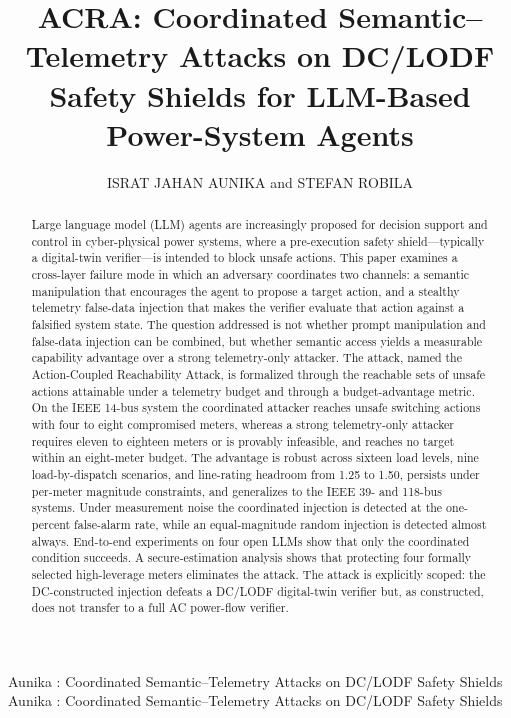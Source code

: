 \documentclass{ieeeaccess}
\begin{document}

\title{ACRA: Coordinated Semantic--Telemetry Attacks on DC/LODF Safety Shields for LLM-Based Power-System Agents}
\author{\uppercase{Israt Jahan Aunika} and \uppercase{Stefan Robila}}
\address[1]{Department of Data Science, Montclair State University, Montclair, NJ 07043 USA (e-mail: isratchy433@gmail.com)}
\address[2]{School of Computing, College of Science and Mathematics, Montclair State University, Montclair, NJ 07043 USA (e-mail: robilas@montclair.edu)}

\markboth
{Aunika \headeretal: Coordinated Semantic--Telemetry Attacks on DC/LODF Safety Shields}
{Aunika \headeretal: Coordinated Semantic--Telemetry Attacks on DC/LODF Safety Shields}


\begin{abstract}
Large language model (LLM) agents are increasingly proposed for decision support and control in cyber-physical power systems, where a pre-execution safety shield---typically a digital-twin verifier---is intended to block unsafe actions. This paper examines a cross-layer failure mode in which an adversary coordinates two channels: a semantic manipulation that encourages the agent to propose a target action, and a stealthy telemetry false-data injection that makes the verifier evaluate that action against a falsified system state. The question addressed is not whether prompt manipulation and false-data injection can be combined, but whether semantic access yields a measurable capability advantage over a strong telemetry-only attacker. The attack, named the Action-Coupled Reachability Attack, is formalized through the reachable sets of unsafe actions attainable under a telemetry budget and through a budget-advantage metric. On the IEEE 14-bus system the coordinated attacker reaches unsafe switching actions with four to eight compromised meters, whereas a strong telemetry-only attacker requires eleven to eighteen meters or is provably infeasible, and reaches no target within an eight-meter budget. The advantage is robust across sixteen load levels, nine load-by-dispatch scenarios, and line-rating headroom from 1.25 to 1.50, persists under per-meter magnitude constraints, and generalizes to the IEEE 39- and 118-bus systems. Under measurement noise the coordinated injection is detected at the one-percent false-alarm rate, while an equal-magnitude random injection is detected almost always. End-to-end experiments on four open LLMs show that only the coordinated condition succeeds. A secure-estimation analysis shows that protecting four formally selected high-leverage meters eliminates the attack. The attack is explicitly scoped: the DC-constructed injection defeats a DC/LODF digital-twin verifier but, as constructed, does not transfer to a full AC power-flow verifier.
\end{abstract}
\end{document}
